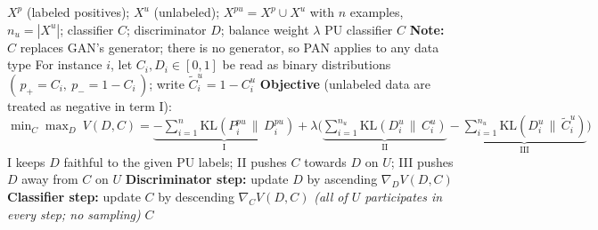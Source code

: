 \documentclass{article}
\begin{document}
\begin{algorithm}[!h]
\renewcommand{\algorithmicrequire}{\textbf{Input:}} %
\renewcommand{\algorithmicensure}{\textbf{Output:}} %
	\caption{PAN (predictive adversarial networks, class-prior free)} %
	\begin{algorithmic}[1] %
	    \REQUIRE
	    $X^{p}$ (labeled positives); $X^{u}$ (unlabeled); $X^{pu}=X^{p}\cup X^{u}$ with $n$ examples,
	    $n_{u}=|X^{u}|$; classifier $C$; discriminator $D$; balance weight $\lambda$
	    \ENSURE
	    PU classifier $C$
	    \STATE \textbf{Note:} $C$ replaces GAN's generator; there is no generator, so PAN applies to any data type %
	    \STATE For instance $i$, let $C_{i},D_{i}\in[0,1]$ be read as binary distributions
	    $(\,p_{+}=C_{i},\ p_{-}=1-C_{i}\,)$; write $\tilde{C}_{i}^{u}=1-C_{i}^{u}$
	    \STATE \textbf{Objective} (unlabeled data are treated as negative in term I):
	    \STATE \quad $\min_{C}\max_{D}\ V(D,C)=
	    \underbrace{-\sum_{i=1}^{n}\mathrm{KL}\!\left(P_{i}^{pu}\,\|\,D_{i}^{pu}\right)}_{\text{I}}
	    +\lambda\Big(\underbrace{\sum_{i=1}^{n_{u}}\mathrm{KL}\!\left(D_{i}^{u}\,\|\,C_{i}^{u}\right)}_{\text{II}}
	    -\underbrace{\sum_{i=1}^{n_{u}}\mathrm{KL}\!\left(D_{i}^{u}\,\|\,\tilde{C}_{i}^{u}\right)}_{\text{III}}\Big)$
	    \STATE \quad I keeps $D$ faithful to the given PU labels;
	    II pushes $C$ towards $D$ on $U$; III pushes $D$ away from $C$ on $U$ %
	    \STATE \textbf{Discriminator step:} update $D$ by ascending $\nabla_{D}V(D,C)$ %
	    \STATE \textbf{Classifier step:} update $C$ by descending $\nabla_{C}V(D,C)$ %
	    \STATE \emph{(all of $U$ participates in every step; no sampling)}
	    \ENDWHILE
		\RETURN $C$
	\end{algorithmic}
\end{algorithm}
\end{document}
